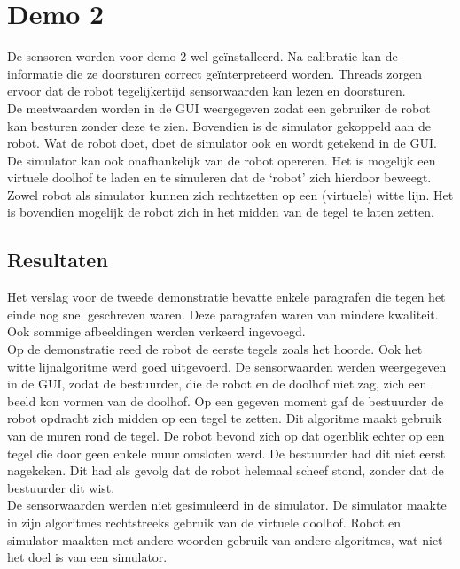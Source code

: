 \documentclass[eind]{penoverslag}
\begin{document}
\section{Demo 2} %
\label{Asec:demo2}
De sensoren worden voor demo 2 wel ge\"installeerd. Na calibratie kan de informatie die ze doorsturen correct ge\"interpreteerd worden. Threads zorgen ervoor dat de robot tegelijkertijd sensorwaarden kan lezen en doorsturen.\\

De meetwaarden worden in de GUI weergegeven zodat een gebruiker de robot kan besturen zonder deze te zien. Bovendien is de simulator gekoppeld aan de robot. Wat de robot doet, doet de simulator ook en wordt getekend in de GUI. De simulator kan ook onafhankelijk van de robot opereren. Het is mogelijk een virtuele doolhof te laden en te simuleren dat de `robot' zich hierdoor beweegt. Zowel robot als simulator kunnen zich rechtzetten op een (virtuele) witte lijn. Het is bovendien mogelijk de robot zich in het midden van de tegel te laten zetten.


\subsection{Resultaten} %
\label{Assec:result2}
Het verslag voor de tweede demonstratie bevatte enkele paragrafen die tegen het einde nog snel geschreven waren. Deze paragrafen waren van mindere kwaliteit. Ook sommige afbeeldingen werden verkeerd ingevoegd.\\

Op de demonstratie reed de robot de eerste tegels zoals het hoorde. Ook het witte lijnalgoritme werd goed uitgevoerd. De sensorwaarden werden weergegeven in de GUI, zodat de bestuurder, die de robot en de doolhof niet zag, zich een beeld kon vormen van de doolhof. Op een gegeven moment gaf de bestuurder de robot opdracht zich midden op een tegel te zetten. Dit algoritme maakt gebruik van de muren rond de tegel. De robot bevond zich op dat ogenblik echter op een tegel die door geen enkele muur omsloten werd. De bestuurder had dit niet eerst nagekeken. Dit had als gevolg dat de robot helemaal scheef stond, zonder dat de bestuurder dit wist.\\

De sensorwaarden werden niet gesimuleerd in de simulator. De simulator maakte in zijn algoritmes rechtstreeks gebruik van de virtuele doolhof. Robot en simulator maakten met andere woorden gebruik van andere algoritmes, wat niet het doel is van een simulator.\\
\end{document}
